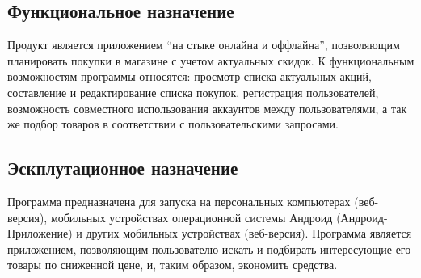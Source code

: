 \subsection{Функциональное назначение}
Продукт является приложением ``на стыке онлайна и оффлайна'', позволяющим планировать
покупки в магазине с учетом актуальных скидок. 
К функциональным возможностям программы относятся:
просмотр списка актуальных акций,
составление и редактирование списка покупок, 
регистрация пользователей,
возможность совместного использования аккаунтов между пользователями,
а так же подбор товаров в соответствии с пользовательскими запросами.

\subsection{Эскплутационное назначение}
Программа предназначена для запуска на персональных компьютерах (веб-версия), мобильных устройствах операционной
системы Андроид (Андроид-Приложение) и других мобильных устройствах (веб-версия). Программа является 
приложением, позволяющим пользователю искать и подбирать интересующие его товары по сниженной цене, и, таким образом, экономить
средства. 



